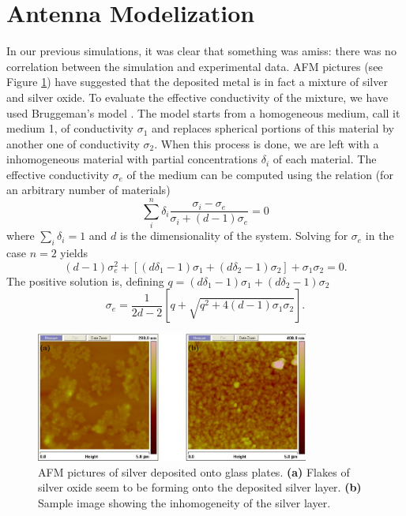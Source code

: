 \section{Antenna Modelization}

In our previous simulations, it was clear that something was amiss:
there was no correlation between the simulation and
experimental data. AFM pictures (see Figure \ref{fig:antenna.AFM})  have suggested that the deposited
metal is in fact a mixture of silver and silver oxide. To evaluate
the effective conductivity of the mixture, we have used Bruggeman's model \cite{LAN1978}.
The model starts from a homogeneous medium, call it medium 1, 
of conductivity $\sigma_1$ and replaces spherical portions of this material 
by another one of conductivity $\sigma_2$. When this process is done, 
we are left with a inhomogeneous material with partial concentrations $\delta_i$
of each material. The effective conductivity $\sigma_e$ of the medium can be computed
using the relation (for an arbitrary number of materials)
  \begin{equation}
    \sum_i^n \delta_i \frac{\sigma_i-\sigma_e}{\sigma_i+(d-1)\sigma_e} =0 
  \end{equation}
where $\sum_i\delta_i=1$ and $d$ is the dimensionality of the system.
Solving for $\sigma_e$ in the case $n=2$ yields
  \begin{equation}
   (d-1)\sigma_e^2+\left[\left(d\delta_1-1\right)\sigma_1+\left(d\delta_2-1\right)\sigma_2\right]+\sigma_1\sigma_2=0.
  \end{equation}
The positive solution is, defining $q=\left(d\delta_1-1\right)\sigma_1+\left(d\delta_2-1\right)\sigma_2$
  \begin{equation}
   \label{eq:antenna:bruggeman}
   \sigma_e = \frac{1}{2d-2}\left[q+\sqrt{q^2+4(d-1)\sigma_1\sigma_2}\right].
  \end{equation}
  
\begin{figure}
 \centering
 \includegraphics[width=0.8\textwidth]{figs/active/out/AFM.pdf}
 \caption[AFM pictures of silver deposited onto glass plates]{AFM pictures of silver deposited onto glass plates. \textbf{(a)} Flakes of silver oxide seem to be forming onto the deposited
	  silver layer. \textbf{(b)} Sample image showing the inhomogeneity of the
	  silver layer.}
 \label{fig:antenna.AFM}
\end{figure}


